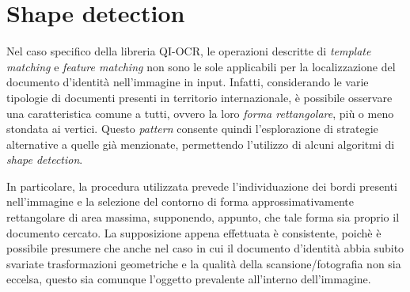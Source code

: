 \section{Shape detection}
Nel caso specifico della libreria QI-OCR, le operazioni descritte di \textit{template matching} e \textit{feature matching} non sono le sole applicabili per la localizzazione del documento d'identit\`a nell'immagine in input. Infatti, considerando le varie tipologie di documenti presenti in territorio internazionale, \`e possibile osservare una caratteristica comune a tutti, ovvero la loro \textit{forma rettangolare}, pi\`u o meno stondata ai vertici. Questo \textit{pattern} consente quindi l'esplorazione di strategie alternative a quelle gi\`a menzionate, permettendo l'utilizzo di alcuni algoritmi di \textit{shape detection}.\par
In particolare, la procedura utilizzata prevede l'individuazione dei bordi presenti nell'immagine e la selezione del contorno di forma approssimativamente rettangolare di area massima, supponendo, appunto, che tale forma sia proprio il documento cercato. La supposizione appena effettuata \`e consistente, poich\`e \`e possibile presumere che anche nel caso in cui il documento d'identit\`a abbia subito svariate trasformazioni geometriche e la qualit\`a della scansione/fotografia non sia eccelsa, questo sia comunque l'oggetto prevalente all'interno dell'immagine.

